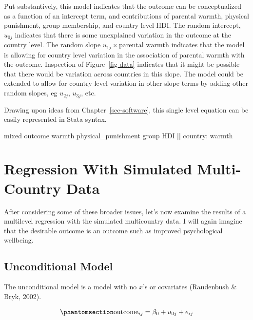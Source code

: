 \documentclass[
  letterpaper,
  DIV=11,
  numbers=noendperiod]{scrreprt}
\newenvironment{Shaded}{\begin{snugshade}}{\end{snugshade}}
\newcommand{\FunctionTok}[1]{\textcolor[rgb]{0.28,0.35,0.67}{#1}}
\newcommand{\NormalTok}[1]{\textcolor[rgb]{0.00,0.23,0.31}{#1}}
\begin{document}
Put substantively, this model indicates that the outcome can be
conceptualized as a function of an intercept term, and contributions of
parental warmth, physical punishment, group membership, and country
level HDI. The random intercept, \(u_{0j}\) indicates that there is some
unexplained variation in the outcome at the country level. The random
slope \(u_{1j} \times \text{parental warmth}\) indicates that the model
is allowing for country level variation in the association of parental
warmth with the outcome. Inspection of Figure~\ref{fig-data} indicates
that it might be possible that there would be variation across countries
in this slope. The model could be extended to allow for country level
variation in other slope terms by adding other random slopes, eg
\(u_{2j}\), \(u_{3j}\), etc.

Drawing upon ideas from Chapter~\ref{sec-software}, this single level
equation can be easily represented in Stata syntax.

\begin{Shaded}
\begin{Highlighting}[]

\NormalTok{mixed outcome warmth physical\_punishment }\FunctionTok{group}\NormalTok{ HDI || country: warmth}
\end{Highlighting}
\end{Shaded}

\section{Regression With Simulated Multi-Country
Data}\label{sec-regression}

After considering some of these broader issues, let's now examine the
results of a multilevel regression with the simulated multicountry data.
I will again imagine that the desirable outcome is an outcome such as
improved psychological wellbeing.

\subsection{Unconditional Model}\label{sec-unconditional}

The unconditional model is a model with no \(x\)'s or covariates
(Raudenbush \& Bryk, 2002).

\begin{equation}\phantomsection\label{eq-unconditional}{\text{outcome}_{ij} = \beta_0 + u_{0j} + e_{ij}}\end{equation}
\end{document}
